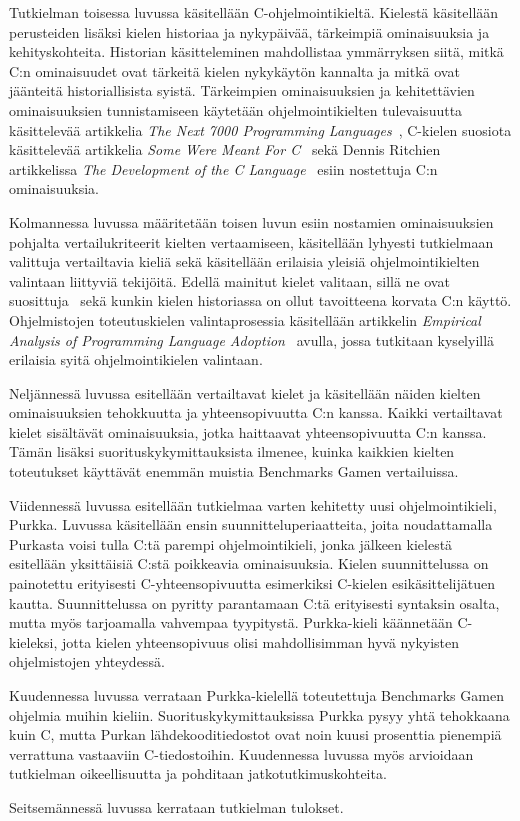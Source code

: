 Tutkielman toisessa luvussa käsitellään C-ohjelmointikieltä. Kielestä
käsitellään perusteiden lisäksi kielen historiaa ja nykypäivää, tärkeimpiä
ominaisuuksia ja kehityskohteita. Historian käsitteleminen mahdollistaa
ymmärryksen siitä, mitkä C:n ominaisuudet ovat tärkeitä kielen nykykäytön
kannalta ja mitkä ovat jäänteitä historiallisista syistä. Tärkeimpien
ominaisuuksien ja kehitettävien ominaisuuksien tunnistamiseen käytetään
ohjelmointikielten tulevaisuutta käsittelevää artikkelia \emph{The Next 7000
Programming Languages}~\citep{next7000}, C-kielen suosiota käsittelevää
artikkelia \emph{Some Were Meant For C}~\citep{somemeantforc} sekä Dennis
Ritchien artikkelissa \emph{The Development of the C Language}~\citep{chistory}
esiin nostettuja C:n ominaisuuksia.

Kolmannessa luvussa määritetään toisen luvun esiin nostamien ominaisuuksien
pohjalta vertailukriteerit kielten vertaamiseen, käsitellään lyhyesti
tutkielmaan valittuja vertailtavia kieliä sekä käsitellään erilaisia yleisiä
ohjelmointikielten valintaan liittyviä tekijöitä. Edellä mainitut kielet
valitaan, sillä ne ovat suosittuja~\citep{tiobe} sekä kunkin kielen historiassa
on ollut tavoitteena korvata C:n käyttö. Ohjelmistojen toteutuskielen
valintaprosessia käsitellään artikkelin \emph{Empirical Analysis of Programming
Language Adoption}~\citep{empiricalpopularity} avulla, jossa tutkitaan
kyselyillä erilaisia syitä ohjelmointikielen valintaan.

Neljännessä luvussa esitellään vertailtavat kielet ja käsitellään näiden
kielten ominaisuuksien tehokkuutta ja yhteensopivuutta C:n kanssa. Kaikki
vertailtavat kielet sisältävät ominaisuuksia, jotka haittaavat yhteensopivuutta
C:n kanssa. Tämän lisäksi suorituskykymittauksista ilmenee, kuinka kaikkien
kielten toteutukset käyttävät enemmän muistia Benchmarks Gamen vertailuissa.

Viidennessä luvussa esitellään tutkielmaa varten kehitetty uusi
ohjelmointikieli, Purkka. Luvussa käsitellään ensin suunnitteluperiaatteita,
joita noudattamalla Purkasta voisi tulla C:tä parempi ohjelmointikieli, jonka
jälkeen kielestä esitellään yksittäisiä C:stä poikkeavia ominaisuuksia. Kielen
suunnittelussa on painotettu erityisesti C-yhteensopivuutta esimerkiksi
C-kielen esikäsittelijätuen kautta. Suunnittelussa on pyritty parantamaan C:tä
erityisesti syntaksin osalta, mutta myös tarjoamalla vahvempaa tyypitystä.
Purkka-kieli käännetään C-kieleksi, jotta kielen yhteensopivuus olisi
mahdollisimman hyvä nykyisten ohjelmistojen yhteydessä.

Kuudennessa luvussa verrataan Purkka-kielellä toteutettuja Benchmarks Gamen
ohjelmia muihin kieliin. Suorituskykymittauksissa Purkka pysyy yhtä tehokkaana
kuin C, mutta Purkan lähdekooditiedostot ovat noin kuusi prosenttia pienempiä
verrattuna vastaaviin C-tiedostoihin. Kuudennessa luvussa myös arvioidaan
tutkielman oikeellisuutta ja pohditaan jatkotutkimuskohteita.

Seitsemännessä luvussa kerrataan tutkielman tulokset.
